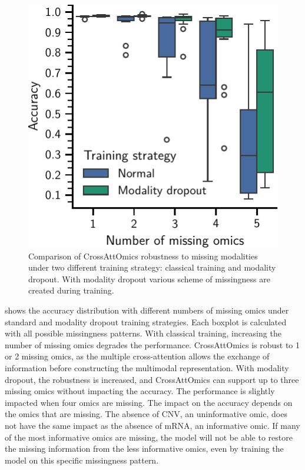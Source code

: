 \documentclass[../main.tex]{subfiles}
\begin{document}
	    \begin{figure}
	        \centering
	        \vspace{-0.8\intextsep}
	        \includegraphics{robustness_missing_modalities_dropout.pdf}
	        \caption{Comparison of CrossAttOmics robustness to missing modalities under two different training strategy: classical training and modality dropout. With modality dropout various scheme of missingness are created during training.}\label{fig:modality_dropout}
	    \end{figure}
	     shows the accuracy distribution with different numbers of missing omics under standard and modality dropout training strategies.
	    Each boxplot is calculated with all possible missingness patterns.
	    With classical training, increasing the number of missing omics degrades the performance.
	    CrossAttOmics is robust to 1 or 2 missing omics, as the multiple cross-attention allows the exchange of information before constructing the multimodal representation.
	    With modality dropout, the robustness is increased, and CrossAttOmics can support up to three missing omics without impacting the accuracy.
	    The performance is slightly impacted when four omics are missing.
	    The impact on the accuracy depends on the omics that are missing.
	    The absence of CNV, an uninformative omic, does not have the same impact as the absence of mRNA, an informative omic.
	    If many of the most informative omics are missing, the model will not be able to restore the missing information from the less informative omics, even by training the model on this specific missingness pattern.
\end{document}

